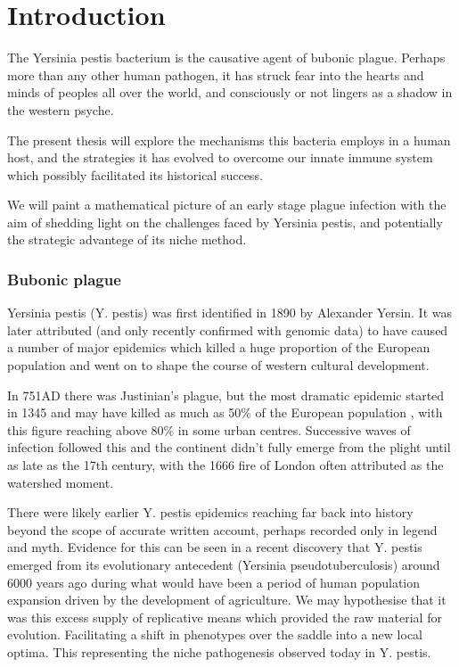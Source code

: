 






\chapter{Introduction}










The Yersinia pestis bacterium is the causative agent of bubonic plague. Perhaps more than any other human pathogen, it has struck fear into the hearts and minds of peoples all over the world, and consciously or not lingers as a shadow in the western psyche. 

The present thesis will explore the mechanisms this bacteria employs in a human host, and the strategies it has evolved to overcome our innate immune system which possibly facilitated its historical success. 

We will paint a mathematical picture of an early stage plague infection with the aim of shedding light on the challenges faced by Yersinia pestis, and potentially the strategic advantege of its niche method.   




\subsection{Bubonic plague}
Yersinia pestis (Y. pestis) was first identified in 1890 by Alexander Yersin. It was later attributed (and only recently confirmed with genomic data) to have caused a number of major epidemics which killed a huge proportion of the European population and went on to shape the course of western cultural development. 


In 751AD there was Justinian's plague, but the most dramatic epidemic started in 1345 and may have killed as much as 50\% of the European population \cite{belich2022world}, with this figure reaching above 80\% in some urban centres. Successive waves of infection followed this and the continent didn't fully emerge from the plight until as late as the 17th century, with the 1666 fire of London often attributed as the watershed moment.\par
There were likely earlier Y. pestis epidemics reaching far back into history beyond the scope of accurate written account, perhaps recorded only in legend and myth. Evidence for this can be seen in a recent discovery that Y. pestis emerged from its evolutionary antecedent (Yersinia pseudotuberculosis) around 6000 years ago during what would have been a period of human population expansion driven by the development of agriculture. We may hypothesise that it was this excess supply of replicative means which provided the raw material for evolution. Facilitating a shift in phenotypes over the saddle into a new local optima. This representing the niche pathogenesis observed today in Y. pestis.



